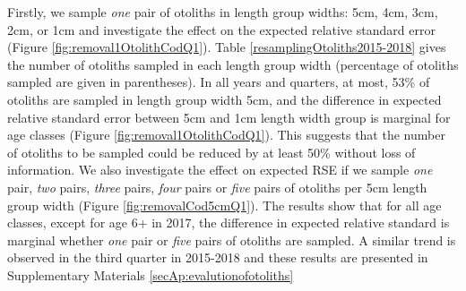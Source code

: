 \documentclass[a4paper 12pt]{article}
\numberwithin{equation}{section}
\begin{document}
Firstly, we sample \textit{one} pair of otoliths in length group widths: 5cm, 4cm, 3cm, 2cm, or 1cm and investigate the effect on the expected relative standard error (Figure \ref{fig:removal1OtolithCodQ1}). Table \ref{resamplingOtoliths2015-2018} gives the number of otoliths sampled in each length group width (percentage of otoliths sampled are given in parentheses). In all years and quarters, at most, 53\% of otoliths are sampled in length group width 5cm, and the difference in expected relative standard error between 5cm and 1cm length width group is marginal for age classes (Figure \ref{fig:removal1OtolithCodQ1}). This suggests that the number of otoliths to be sampled could be reduced by at least 50\% without loss of information. We also investigate the effect on expected RSE if we sample \textit{one} pair, \textit{two} pairs, \textit{three} pairs, \textit{four} pairs  or \textit{five} pairs of otoliths per 5cm length group width (Figure  \ref{fig:removalCod5cmQ1}). The results show that for all age classes, except for age 6+ in 2017, the difference in expected relative standard is marginal whether \textit{one} pair or \textit{five} pairs of otoliths are sampled. A similar trend is observed in the third quarter in 2015-2018 and these results are presented  in Supplementary Materials \ref{secAp:evalutionofotoliths} \\
\end{document}
